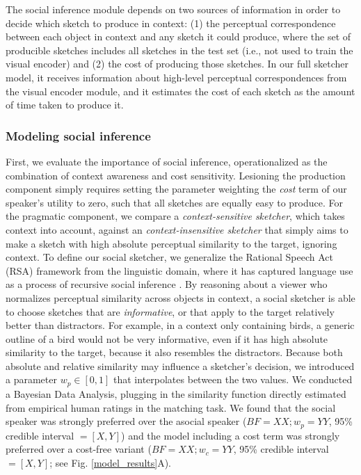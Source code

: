 \documentclass[9pt,twocolumn,twoside]{pnas-new}
\begin{document}
The social inference module depends on two sources of information in order to decide which sketch to produce in context: (1) the perceptual correspondence between each object in context and any sketch it could produce, where the set of producible sketches includes all sketches in the test set (i.e., not used to train the visual encoder) and (2) the cost of producing those sketches. In our full sketcher model, it receives information about high-level perceptual correspondences from the visual encoder module, and it estimates the cost of each sketch as the amount of time taken to produce it. 

\subsubsection*{Modeling social inference}


First, we evaluate the importance of social inference, operationalized as the combination of context awareness and cost sensitivity.  
Lesioning the production component simply requires setting the parameter weighting the \emph{cost} term of our speaker's utility to zero, such that all sketches are equally easy to produce. For the pragmatic component, we compare a \emph{context-sensitive sketcher}, which takes context into account, against an \emph{context-insensitive sketcher} that simply aims to make a sketch with high absolute perceptual similarity to the target, ignoring context. To define our social sketcher, we generalize the Rational Speech Act (RSA) framework from the linguistic domain, where it has captured language use as a process of recursive social inference \cite{goodman2016pragmatic,kao2014formalizing,goodman2013knowledge}. By reasoning about a viewer who normalizes perceptual similarity across objects in context, a social sketcher is able to choose sketches that are \emph{informative}, or that apply to the target relatively better than distractors. For example, in a context only containing birds, a generic outline of a bird would not be very informative, even if it has high absolute similarity to the target, because it also resembles the distractors. Because both absolute and relative similarity may influence a sketcher's decision, we introduced a parameter $w_p \in [0,1]$ that interpolates between the two values. We conducted a Bayesian Data Analysis, plugging in the similarity function directly estimated from empirical human ratings in the matching task. We found that the social speaker was strongly preferred over the asocial speaker ($BF = XX; w_p = YY$, 95\% credible interval $= [X, Y]$) and the model including a cost term was strongly preferred over a cost-free variant ($BF = XX; w_c = YY$, 95\% credible interval $=[X, Y]$; see Fig. \ref{model_results}A).
\end{document}
